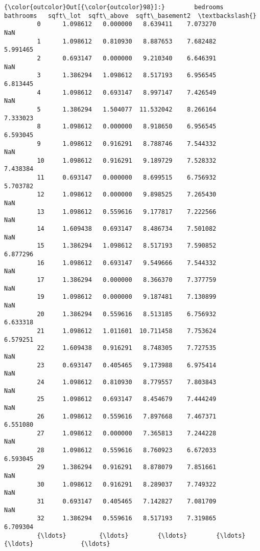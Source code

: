 \documentclass[11pt]{article}
\begin{document}
\begin{Verbatim}[commandchars=\\\{\}]
{\color{outcolor}Out[{\color{outcolor}98}]:}        bedrooms  bathrooms   sqft\_lot  sqft\_above  sqft\_basement2  \textbackslash{}
         0      1.098612   0.000000   8.639411    7.073270             NaN   
         1      1.098612   0.810930   8.887653    7.682482        5.991465   
         2      0.693147   0.000000   9.210340    6.646391             NaN   
         3      1.386294   1.098612   8.517193    6.956545        6.813445   
         4      1.098612   0.693147   8.997147    7.426549             NaN   
         5      1.386294   1.504077  11.532042    8.266164        7.333023   
         8      1.098612   0.000000   8.918650    6.956545        6.593045   
         9      1.098612   0.916291   8.788746    7.544332             NaN   
         10     1.098612   0.916291   9.189729    7.528332        7.438384   
         11     0.693147   0.000000   8.699515    6.756932        5.703782   
         12     1.098612   0.000000   9.898525    7.265430             NaN   
         13     1.098612   0.559616   9.177817    7.222566             NaN   
         14     1.609438   0.693147   8.486734    7.501082             NaN   
         15     1.386294   1.098612   8.517193    7.590852        6.877296   
         16     1.098612   0.693147   9.549666    7.544332             NaN   
         17     1.386294   0.000000   8.366370    7.377759             NaN   
         19     1.098612   0.000000   9.187481    7.130899             NaN   
         20     1.386294   0.559616   8.513185    6.756932        6.633318   
         21     1.098612   1.011601  10.711458    7.753624        6.579251   
         22     1.609438   0.916291   8.748305    7.727535             NaN   
         23     0.693147   0.405465   9.173988    6.975414             NaN   
         24     1.098612   0.810930   8.779557    7.803843             NaN   
         25     1.098612   0.693147   8.454679    7.444249             NaN   
         26     1.098612   0.559616   7.897668    7.467371        6.551080   
         27     1.098612   0.000000   7.365813    7.244228             NaN   
         28     1.098612   0.559616   8.760923    6.672033        6.593045   
         29     1.386294   0.916291   8.878079    7.851661             NaN   
         30     1.098612   0.916291   8.289037    7.749322             NaN   
         31     0.693147   0.405465   7.142827    7.081709             NaN   
         32     1.386294   0.559616   8.517193    7.319865        6.709304   
         {\ldots}         {\ldots}        {\ldots}        {\ldots}         {\ldots}             {\ldots}   

\end{Verbatim}
\end{document}

